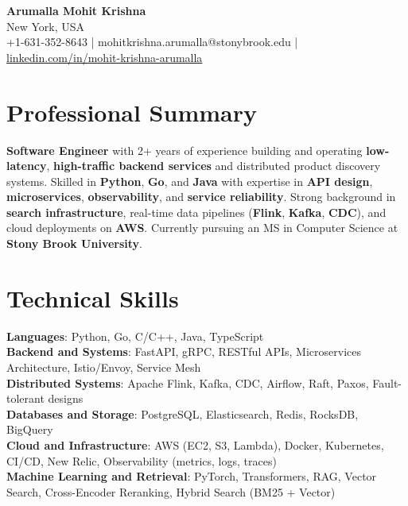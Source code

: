 \documentclass[letterpaper,11pt]{article}
\begin{document}
\begin{center}
  {\Large \textbf{Arumalla Mohit Krishna}} \\
  New York, USA \\
  +1-631-352-8643 \enspace | \enspace mohitkrishna.arumalla@stonybrook.edu \enspace | \enspace \href{https://www.linkedin.com/in/mohit-krishna-arumalla}{linkedin.com/in/mohit-krishna-arumalla}
\end{center}

\section{Professional Summary}
  \begin{itemize}[leftmargin=0.15in, label={}]
    \small{\item{
     \textbf{Software Engineer} with 2+ years of experience building and operating \textbf{low-latency}, \textbf{high-traffic backend services} and distributed product discovery systems. Skilled in \textbf{Python}, \textbf{Go}, and \textbf{Java} with expertise in \textbf{API design}, \textbf{microservices}, \textbf{observability}, and \textbf{service reliability}. Strong background in \textbf{search infrastructure}, real-time data pipelines (\textbf{Flink}, \textbf{Kafka}, \textbf{CDC}), and cloud deployments on \textbf{AWS}. Currently pursuing an MS in Computer Science at \textbf{Stony Brook University}.
    }}
  \end{itemize}
\vspace{-16pt}

\section{Technical Skills}
 \begin{itemize}[leftmargin=0.15in, label={}]
    \small{\item{
     \textbf{Languages}: Python, Go, C/C++, Java, TypeScript \\
     \textbf{Backend and Systems}: FastAPI, gRPC, RESTful APIs, Microservices Architecture, Istio/Envoy, Service Mesh \\
     \textbf{Distributed Systems}: Apache Flink, Kafka, CDC, Airflow, Raft, Paxos, Fault-tolerant designs \\
     \textbf{Databases and Storage}: PostgreSQL, Elasticsearch, Redis, RocksDB, BigQuery \\
     \textbf{Cloud and Infrastructure}: AWS (EC2, S3, Lambda), Docker, Kubernetes, CI/CD, New Relic, Observability (metrics, logs, traces) \\
     \textbf{Machine Learning and Retrieval}: PyTorch, Transformers, RAG, Vector Search, Cross-Encoder Reranking, Hybrid Search (BM25 + Vector)
    }}
 \end{itemize}
\vspace{-16pt}
\end{document}
